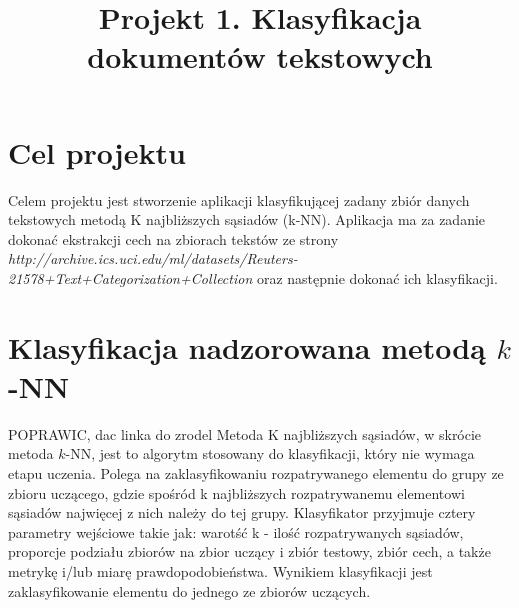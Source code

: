 \documentclass{classrep}
\author{
  \studentinfo{Julia Szymańska}{224441} \and
  \studentinfo{Przemysław Zdrzalik}{224466} }
\title{Projekt 1. Klasyfikacja dokumentów tekstowych}
\begin{document}
\maketitle


\section{Cel projektu}
Celem projektu jest stworzenie aplikacji klasyfikującej zadany zbiór danych tekstowych metodą K najbliższych sąsiadów (k-NN). Aplikacja ma za zadanie dokonać ekstrakcji cech na zbiorach tekstów ze strony \\\textit{http://archive.ics.uci.edu/ml/datasets/Reuters-21578+Text+Categorization+Collection} oraz następnie dokonać ich klasyfikacji.\\


\section{Klasyfikacja nadzorowana metodą $k$-NN}
\color{red} POPRAWIC, dac linka do zrodel
\color{black}
Metoda K najbliższych sąsiadów, w skrócie metoda $k$-NN, jest to algorytm stosowany do klasyfikacji, który nie wymaga etapu uczenia. 
Polega na zaklasyfikowaniu rozpatrywanego elementu do grupy ze zbioru uczącego, gdzie spośród k najbliższych rozpatrywanemu elementowi sąsiadów najwięcej z nich należy do tej grupy. Klasyfikator przyjmuje cztery parametry wejściowe takie jak: warotść k - ilość rozpatrywanych sąsiadów, proporcje podziału zbiorów na zbior uczący i zbiór testowy, zbiór cech, a także metrykę i/lub miarę prawdopodobieństwa. Wynikiem klasyfikacji jest zaklasyfikowanie elementu do jednego ze zbiorów uczących. 
\end{document}
